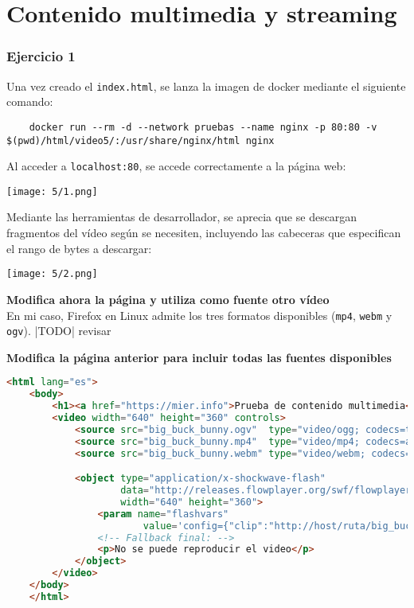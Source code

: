 \chapter{Contenido multimedia y streaming}\label{chap:5}
\subsection{Ejercicio 1}
Una vez creado el \Verb#index.html#, se lanza la imagen de docker mediante el
siguiente comando:
\begin{lstlisting}
	docker run --rm -d --network pruebas --name nginx -p 80:80 -v $(pwd)/html/video5/:/usr/share/nginx/html nginx
\end{lstlisting}

Al acceder a \Verb#localhost:80#, se accede correctamente a la página web: \\
\begin{minipage}{\linewidth}
	\centering
	\texttt{[image: 5/1.png]}
	\label{fig:5/1}
\end{minipage}

Mediante las herramientas de desarrollador, se aprecia que se descargan fragmentos del vídeo
según se necesiten, incluyendo las cabeceras que especifican el rango de bytes a descargar: \\
\begin{minipage}{\linewidth}
	\centering
	\texttt{[image: 5/2.png]}
	\label{fig:5/2}
\end{minipage}

\textbf{Modifica ahora la página y utiliza como fuente otro vídeo} \\
En mi caso, Firefox en Linux admite los tres formatos disponibles (\Verb#mp4#, \Verb#webm# y \Verb#ogv#).
|TODO| revisar

\textbf{Modifica la página anterior para incluir todas las fuentes disponibles}
\begin{lstlisting}[language=html]
	<html lang="es">
	<body>
		<h1><a href="https://mier.info">Prueba de contenido multimedia</a></h1>
		<video width="640" height="360" controls>
			<source src="big_buck_bunny.ogv"  type="video/ogg; codecs=theora">
			<source src="big_buck_bunny.mp4"  type="video/mp4; codecs=avc1.42E01E,mp4a.40.2">
			<source src="big_buck_bunny.webm" type="video/webm; codecs=vp8,vorbis">

			<object type="application/x-shockwave-flash"
					data="http://releases.flowplayer.org/swf/flowplayer-3.2.1.swf"
					width="640" height="360">
				<param name="flashvars"
						value='config={"clip":"http://host/ruta/big_buck_bunny.mp4"}'/>
				<!-- Fallback final: -->
				<p>No se puede reproducir el video</p>
			</object>
		</video>
	</body>
	</html>
\end{lstlisting}
\newpage{} %
